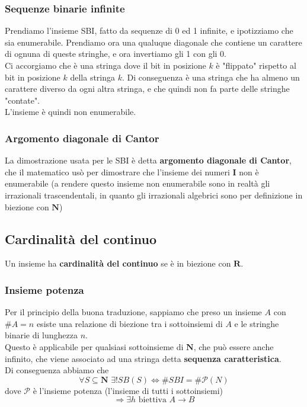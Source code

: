 \documentclass{report}
\begin{document}
        \subsubsection{Sequenze binarie infinite}
            Prendiamo l'insieme SBI, fatto da sequenze di 0 ed 1 infinite, e ipotizziamo che sia enumerabile.
            Prendiamo ora una qualuque diagonale che contiene un carattere di ognuna di queste stringhe, e ora
            invertiamo gli 1 con gli 0. \\
            Ci accorgiamo che è una stringa dove il bit in posizione $k$ è "flippato" rispetto 
            al bit in posizione $k$ della stringa $k$. Di conseguenza è una stringa che ha almeno un carattere
            diverso da ogni altra stringa, e che quindi non fa parte delle stringhe "contate". \\
            L'insieme è quindi non enumerabile. 
        \subsubsection{Argomento diagonale di Cantor}
            La dimostrazione usata per le SBI è detta \textbf{argomento diagonale di Cantor}, 
            che il matematico usò per dimostrare che l'insieme dei numeri $\mathbf{I}$ non è
            enumerabile (a rendere questo insieme non enumerabile sono in realtà gli irrazionali trascendentali,
            in quanto gli irrazionali algebrici sono per definizione in biezione con $\mathbf{N}$)
    \subsection{Cardinalità del continuo}
        Un insieme ha \textbf{cardinalità del continuo} se è in biezione con $\mathbf{R}$. 
        \subsubsection{Insieme potenza}
            Per il principio della buona traduzione, sappiamo che preso un insieme $A$ 
            con $\#A = n$ esiste una relazione di biezione tra i sottoinsiemi di $A$ e le stringhe binarie di lunghezza $n$. \\
            Questo è applicabile per qualsiasi sottoinsieme di $\mathbf{N}$, che può essere anche infinito, 
            che viene associato ad una stringa detta \textbf{sequenza caratteristica}. \\
            Di conseguenza abbiamo che 
            $$\forall S \subseteq \mathbf{N} \, \, \exists! SB\left(S\right) \Longleftrightarrow
                \#SBI = \#\mathcal{P}\left(N\right)$$ 
            dove $\mathcal{P}$ è l'insieme potenza (l'insieme di tutti i sottoinsiemi)
            $$\Longrightarrow \exists h \textrm{ biettiva } A \longrightarrow B$$
\end{document}
